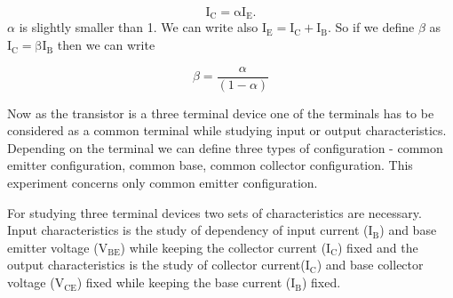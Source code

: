 \documentclass[12pt]{article}
\begin{document}
\begin{equation*}
\mathrm{I_C = \alpha I_E}
.\end{equation*}
\( \alpha \) is slightly smaller than 1. We can write also \( \mathrm{I_E = I_C + I_B}\). So if we define \( \beta \) as \( \mathrm{I_C = \beta I_B} \) then we can write 

\begin{equation*}
\beta = \frac{\alpha}{(1 - \alpha)} 
\end{equation*}

Now as the transistor is a three terminal device one of the terminals has to be considered as a common terminal while studying input or output characteristics. Depending on the terminal we can define three types of configuration - common emitter configuration, common base, common collector configuration. This experiment concerns only common emitter configuration.
\begin{figure}[!ht]
    \centering
    
    \label{fig:my_label}
    \end{figure}
For studying three terminal devices two sets of characteristics are necessary. Input characteristics is the study of dependency of input current (\( \mathrm{I_B} \)) and base emitter voltage (\( \mathrm{V_{BE}} \)) while keeping the collector current (\( \mathrm{I_C}\)) fixed and the output characteristics is the study of collector current(\( \mathrm{I_C }\)) and base collector voltage (\( \mathrm{V_{CE}} \)) fixed while keeping the base current (\( \mathrm{I_B } \)) fixed.
\end{document}
